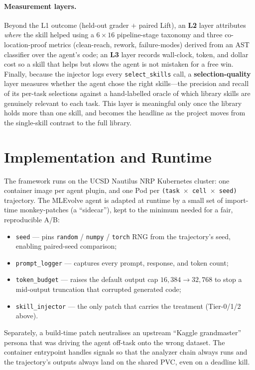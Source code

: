 \documentclass[11pt,a4paper]{article}
\begin{document}
\paragraph{Measurement layers.} Beyond the L1 outcome (held-out grader $+$ paired
Lift), an \textbf{L2} layer attributes \emph{where} the skill helped using a $6\times16$
pipeline-stage taxonomy and three co-location-proof metrics (clean-reach, rework,
failure-modes) derived from an AST classifier over the agent's code; an \textbf{L3} layer
records wall-clock, token, and dollar cost so a skill that helps but slows the agent is
not mistaken for a free win. Finally, because the injector logs every
\texttt{select\_skills} call, a \textbf{selection-quality} layer measures whether the agent
chose the right skills---the precision and recall of its per-task selections against a
hand-labelled oracle of which library skills are genuinely relevant to each task. This
layer is meaningful only once the library holds more than one skill, and becomes the
headline as the project moves from the single-skill contrast to the full library.

\section{Implementation and Runtime}

The framework runs on the UCSD Nautilus NRP Kubernetes cluster: one container image per
agent plugin, and one Pod per \texttt{(task $\times$ cell $\times$ seed)} trajectory. The
MLEvolve agent is adapted at runtime by a small set of import-time monkey-patches (a
``sidecar''), kept to the minimum needed for a fair, reproducible A/B:
\begin{itemize}
\item \texttt{seed} --- pins \texttt{random} / \texttt{numpy} / \texttt{torch} RNG from the
trajectory's seed, enabling paired-seed comparison;
\item \texttt{prompt\_logger} --- captures every prompt, response, and token count;
\item \texttt{token\_budget} --- raises the default output cap $16{,}384 \rightarrow 32{,}768$
to stop a mid-output truncation that corrupted generated code;
\item \texttt{skill\_injector} --- the only patch that carries the treatment (Tier-0/1/2 above).
\end{itemize}
Separately, a build-time patch neutralises an upstream ``Kaggle grandmaster'' persona that
was driving the agent off-task onto the wrong dataset. The container entrypoint handles
signals so that the analyzer chain always runs and the trajectory's outputs always land on
the shared PVC, even on a deadline kill.
\end{document}
